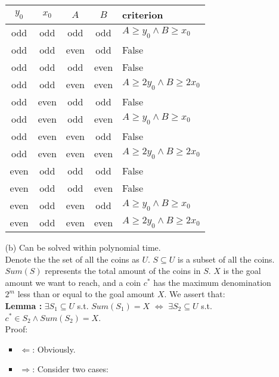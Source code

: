 \documentclass{article}
\begin{document}
\begin{enumerate}
\begin{itemize}
        \begin{table}[H]
        \centering
        \begin{tabular}{|c|c|c|c|l|}
            \hline
            $y_0$&$x_0$&$A$&$B$&criterion\\
            \hline
            odd&odd&odd&odd&$A\geq y_0 \wedge B\geq x_0$\\
            \hline
            odd&odd&even&odd&False\\
            \hline
            odd&odd&odd&even&False\\
            \hline
            odd&odd&even&even&$A\geq 2y_0\wedge B\geq 2x_0$\\
            \hline
            odd&even&odd&odd&False\\
            \hline
            odd&even&odd&even&$A\geq y_0\wedge B\geq x_0$\\
            \hline
            odd&even&even&odd&False\\
            \hline
            odd&even&even&even&$A\geq 2y_0\wedge B\geq 2x_0$\\
            \hline
            even&odd&odd&odd&False\\
            \hline
            even&odd&odd&even&False\\
            \hline
            even&odd&even&odd&$A\geq y_0\wedge B\geq x_0$\\
            \hline
            even&odd&even&even&$A\geq 2y_0\wedge B\geq 2x_0$\\
            \hline
        \end{tabular}
        \end{table}
    \item [(b)] Can be solved within polynomial time.\\ Denote the the set of all the coins as $U$. $S\subseteq U$ is a subset of all the coins. $Sum(S)$ represents the total amount of the coins in $S$. $X$ is the goal amount we want to reach, and a coin $c^*$ has the maximum denomination $2^m$ less than or equal to the goal amount $X$. We assert that:\\ \textbf{Lemma :}
        $\exists S_1\subseteq U$ s.t. $Sum(S_1)=X$ $\Leftrightarrow$ $\exists S_2\subseteq U$ s.t. $c^*\in S_2 \wedge Sum(S_2)=X$.\\
        Proof: \begin{itemize}
            \item $\Leftarrow$: Obviously.
            \item $\Rightarrow$: Consider two cases: \begin{itemize}

\end{itemize}
\end{itemize}
\end{itemize}
\end{enumerate}
\end{document}
